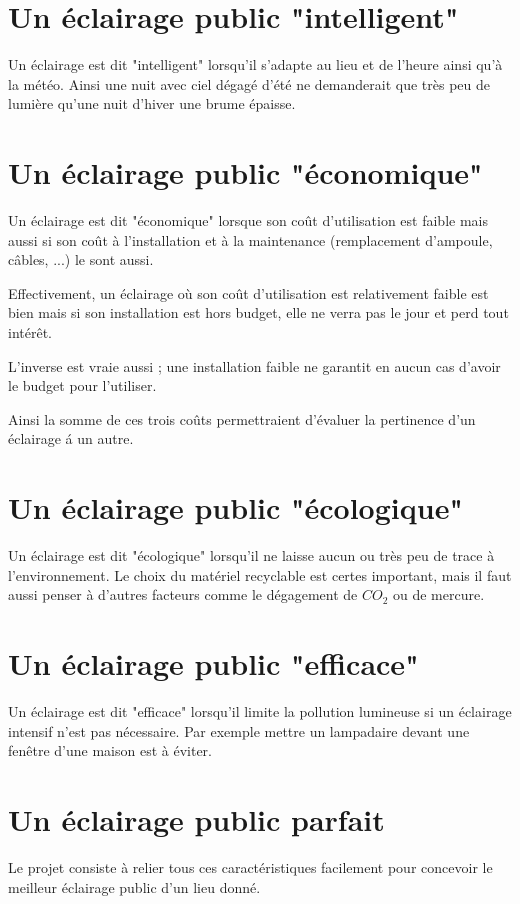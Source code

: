 \section{Un \'eclairage public "intelligent"}



Un \'eclairage est dit "intelligent" lorsqu'il s'adapte au lieu et de l'heure ainsi qu'\`a la m\'et\'eo. Ainsi une nuit avec ciel d\'egag\'e d'\'et\'e ne demanderait que tr\`es peu de lumi\`ere qu'une nuit d'hiver une brume \'epaisse.



\section{Un \'eclairage public "\'economique"}



Un \'eclairage est dit "\'economique" lorsque son co\^ut d'utilisation est faible mais aussi si son co\^ut \`a l'installation et \`a la maintenance (remplacement d'ampoule, c\^ables, ...) le sont aussi.

Effectivement, un \'eclairage o\`u son co\^ut d'utilisation est relativement faible est bien mais si son installation est hors budget, elle ne verra pas le jour et perd tout int\'er\^et.

 L'inverse est vraie aussi ; une installation faible ne garantit en aucun cas d'avoir le budget pour l'utiliser.

Ainsi la somme de ces trois co\^uts permettraient d'\'evaluer la pertinence d'un \'eclairage \'a un autre.



\section{Un \'eclairage public "\'ecologique"}



Un \'eclairage est dit "\'ecologique" lorsqu'il ne laisse aucun ou tr\`es peu de trace \`a l'environnement. Le choix du mat\'eriel  recyclable est certes important, mais il faut aussi penser \`a d'autres facteurs comme le d\'egagement de $CO_2$ ou de mercure.



\section{Un \'eclairage public "efficace"}



Un \'eclairage est dit "efficace" lorsqu'il limite la pollution lumineuse si un \'eclairage intensif n'est pas n\'ecessaire. Par exemple mettre un lampadaire devant une fen\^etre d'une maison est \`a \'eviter.




\section{Un \'eclairage public parfait}


Le projet consiste \`a relier tous ces caract\'eristiques facilement pour concevoir le meilleur \'eclairage public d'un lieu donn\'e.